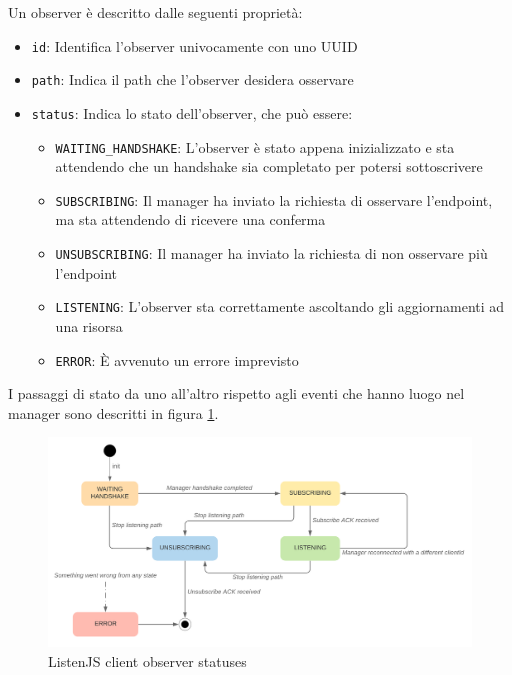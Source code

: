\documentclass[12pt,a4paper,openright,twoside]{report}
\begin{document}
Un observer è descritto dalle seguenti proprietà:
\begin{itemize}
\item \lstinline{id}: Identifica l'observer univocamente con uno UUID
\item \lstinline{path}: Indica il path che l'observer desidera osservare
\item \lstinline{status}: Indica lo stato dell'observer, che può essere:
  \begin{itemize}
  \item \lstinline{WAITING_HANDSHAKE}: L'observer è stato appena inizializzato e sta attendendo che un handshake sia completato per potersi sottoscrivere
  \item \lstinline{SUBSCRIBING}: Il manager ha inviato la richiesta di osservare l'endpoint, ma sta attendendo di ricevere una conferma
  \item \lstinline{UNSUBSCRIBING}: Il manager ha inviato la richiesta di non osservare più l'endpoint
  \item \lstinline{LISTENING}: L'observer sta correttamente ascoltando gli aggiornamenti ad una risorsa
  \item \lstinline{ERROR}: È avvenuto un errore imprevisto
  \end{itemize}
\end{itemize}

I passaggi di stato da uno all'altro rispetto agli eventi che hanno luogo nel manager sono descritti in figura \ref{fig:observer_statuses}.

\begin{figure}[htbp]
\centering
\includegraphics[width=.9\textwidth]{assets/observer_statuses.png}
\caption{ListenJS client observer statuses}
\label{fig:observer_statuses}
\end{figure}
\end{document}
